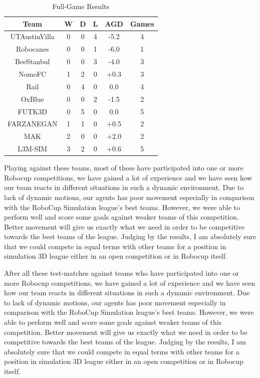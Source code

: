 \begin{table}[t!]
\begin{center}
    \begin{tabular}{cccccc}
    \textbf{Team} 	& \textbf{W} & \textbf{D} & \textbf{L} & \textbf{AGD}\footnotemark 	& \textbf{Games}   \\
    \midrule
    UTAustinVilla 	& 0		& 0		& 4		& -5.2		& 4 			\\
    Robocanes 		& 0		& 0		& 1		& -6.0		& 1 			\\
    BeeStanbul		& 0		& 0		& 3		& -4.0		& 3				\\
    NomoFC 			& 1		& 2		& 0		& +0.3 		& 3 			\\
    Rail 			& 0		& 4		& 0		& 0.0 		& 4 			\\
    OxBlue 			& 0		& 0		& 2		& -1.5 		& 2 			\\
    FUTK3D 			& 0		& 5		& 0		& 0.0 		& 5 			\\
    FARZANEGAN 		& 1		& 1		& 0		& +0.5 		& 2 			\\
    MAK 		    & 2		& 0		& 0		& +2.0 		& 2 			\\
    L3M-SIM			& 3		& 2   	& 0		& +0.6 		& 5 			\\     
    \end{tabular}
\end{center}
\label{GameResults}
\caption{Full-Game Results}
\end{table}


Playing against these teams, most of these have participated into one or more Robocup competitions, we have gained a lot of experience and we have seen how our team reacts in different situations in such a dynamic environment. Due to lack of dynamic motions, our agents has poor movement especially in comparison with the RoboCup Simulation league's best teams. However, we were able to perform well and score some goals against weaker teams of this competition. Better movement will give us exactly what we need in order to be competitive towards the best teams of the league. Judging by the results, I am absolutely sure that we could compete in equal terms with other teams for a position in simulation 3D league either in an open competition or in Robocup itself.

After all these test-matches against teams who have participated into one or more Robocup competitions, we have gained a lot of experience and we have seen how our team reacts in different situations in such a dynamic environment. Due to lack of dynamic motions, our agents has poor movement especially in comparison with the RoboCup Simulation league's best teams. However, we were able to perform well and score some goals against weaker teams of this competition. Better movement will give us exactly what we need in order to be competitive towards the best teams of the league. Judging by the results, I am absolutely sure that we could compete in equal terms with other teams for a position in simulation 3D league either in an open competition or in Robocup itself.

